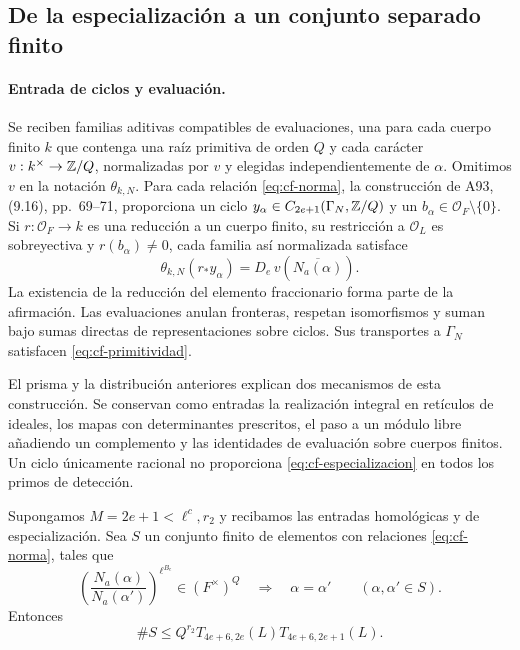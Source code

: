 \subsection{De la especialización a un conjunto separado finito}

\paragraph{Entrada de ciclos y evaluación.}
Se reciben familias aditivas compatibles de evaluaciones, una
para cada cuerpo finito $k$ que contenga una raíz primitiva
de orden $Q$ y cada carácter $v:k^\times\to\mathbb{Z}/Q$,
normalizadas por $v$ y elegidas independientemente de $\alpha$.
Omitimos $v$ en la notación $\theta_{k,N}$.
Para cada relación \eqref{eq:cf-norma}, la construcción de A93,
(9.16), pp.~69--71, proporciona un ciclo
$y_\alpha\in C_{2e+1}(\Gamma_N,\mathbb{Z}/Q)$ y un
$b_\alpha\in\mathcal O_F\setminus\{0\}$.
Si $r:\mathcal O_F\to k$ es una reducción a un cuerpo finito,
su restricción a $\mathcal O_L$ es sobreyectiva y
$r(b_\alpha)\ne0$, cada familia así normalizada satisface
\begin{equation}
 \theta_{k,N}(r_*y_\alpha)
 =D_e\,v\!\left(\overline{N_a(\alpha)}\right).
 \label{eq:cf-especializacion}
\end{equation}
La existencia de la reducción del elemento fraccionario forma
parte de la afirmación. Las evaluaciones anulan fronteras,
respetan isomorfismos y suman bajo sumas directas de
representaciones sobre ciclos. Sus transportes a $\Gamma_N$
satisfacen \eqref{eq:cf-primitividad}.

El prisma y la distribución anteriores explican dos mecanismos
de esta construcción. Se conservan como entradas la realización
integral en retículos de ideales, los mapas con determinantes
prescritos, el paso a un módulo libre añadiendo un complemento
y las identidades de evaluación sobre cuerpos finitos.
Un ciclo únicamente racional no proporciona
\eqref{eq:cf-especializacion} en todos los primos de detección.

\begin{proposicion}
\label{prop:cf-separacion}
Supongamos $M=2e+1<\ell^c,r_2$ y recibamos las entradas
homológicas y de especialización. Sea $S$ un conjunto finito de
elementos con relaciones \eqref{eq:cf-norma}, tales que
\begin{equation}
 \left(\frac{N_a(\alpha)}{N_a(\alpha')}\right)^{\ell^{B_e}}
 \in(F^\times)^Q
 \quad\Longrightarrow\quad\alpha=\alpha'
 \qquad(\alpha,\alpha'\in S).
 \label{eq:cf-separacion}
\end{equation}
Entonces
\begin{equation}
 \#S\le Q^{r_2}T_{4e+6,2e}(L)T_{4e+6,2e+1}(L).
 \label{eq:cf-separacion-cota}
\end{equation}
\end{proposicion}

